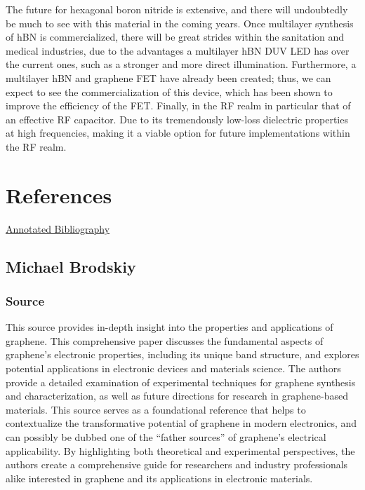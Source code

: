 \documentclass[conference]{IEEEtran}
\begin{document}
The future for hexagonal boron nitride is extensive, and there will undoubtedly be much to see with this material in the coming years. Once multilayer synthesis of hBN is commercialized, there will be great strides within the sanitation and medical industries, due to the advantages a multilayer hBN DUV LED has over the current ones, such as a stronger and more direct illumination. Furthermore, a multilayer hBN and graphene FET have already been created; thus, we can expect to see the commercialization of this device, which has been shown to improve the efficiency of the FET. Finally, in the RF realm in particular that of an effective RF capacitor. Due to its tremendously low-loss dielectric properties at high frequencies, making it a viable option for future implementations within the RF realm.

\section*{References}

\begin{center}
  \underline{Annotated Bibliography}
\end{center}

\subsection{Michael Brodskiy}

\subsubsection{Source \cite{mb4}}

This source provides in-depth insight into the properties and applications of graphene. This comprehensive paper discusses the fundamental aspects of graphene's electronic properties, including its unique band structure, and explores potential applications in electronic devices and materials science. The authors provide a detailed examination of experimental techniques for graphene synthesis and characterization, as well as future directions for research in graphene-based materials. This source serves as a foundational reference that helps to contextualize the transformative potential of graphene in modern electronics, and can possibly be dubbed one of the ``father sources'' of graphene's electrical applicability. By highlighting both theoretical and experimental perspectives, the authors create a comprehensive guide for researchers and industry professionals alike interested in graphene and its applications in electronic materials.
\end{document}
